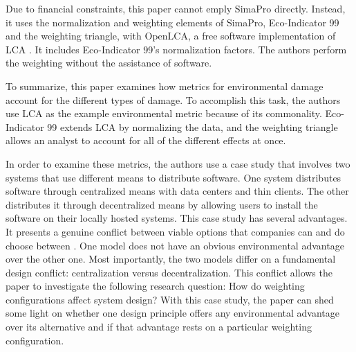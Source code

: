 \documentclass[final,journal,10pt,letterpaper,oneside,twocolumn,compsoc]%
{IEEEtran}
\begin{document}
Due to financial constraints, this paper cannot emply SimaPro directly. Instead,
it uses the normalization and weighting elements of SimaPro, Eco-Indicator 99
and the weighting triangle, with OpenLCA, a free software implementation of LCA
\cite{openlca}. It includes Eco-Indicator 99's normalization factors. The
authors perform the weighting without the assistance of software.

To summarize, this paper examines how metrics for environmental damage account
for the different types of damage. To accomplish this task, the authors use LCA
as the example environmental metric because of its commonality. Eco-Indicator 99
extends LCA by normalizing the data, and the weighting triangle allows an
analyst to account for all of the different effects at once.

In order to examine these metrics, the authors use a case study that involves
two systems that use different means to distribute software. One system
distributes software through centralized means with data centers and thin
clients. The other distributes it through decentralized means by allowing users
to install the software on their locally hosted systems. This case study has
several advantages. It presents a genuine conflict between viable options that
companies can and do choose between \cite{maga}. One model does not have an
obvious environmental advantage over the other one. Most importantly, the two
models differ on a fundamental design conflict: centralization versus
decentralization. This conflict allows the paper to investigate the following
research question: How do weighting configurations affect system design? With
this case study, the paper can shed some light on whether one design principle
offers any environmental advantage over its alternative and if that advantage
rests on a particular weighting configuration.



\end{document}

